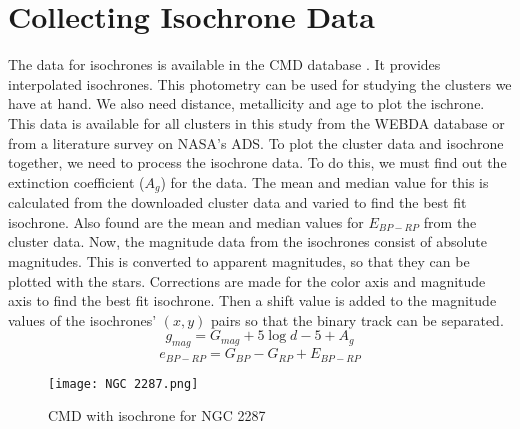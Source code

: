 \section{Collecting Isochrone Data}
The data for isochrones is available in the CMD database \citep{cmdSite}. It provides interpolated isochrones. This photometry can be used for studying the clusters we have at hand. We also need distance, metallicity and age to plot the ischrone. This data is available for all clusters in this study from the WEBDA database \citep{webda} or from a literature survey on NASA's ADS. To plot the cluster data and isochrone together, we need to process the isochrone data. To do this, we must find out the extinction coefficient ($A_g$) for the data. The mean and median value for this is calculated from the downloaded cluster data and varied to find the best fit isochrone. Also found are the mean and median values for $E_{BP-RP}$ from the cluster data. Now, the magnitude data from the isochrones consist of absolute magnitudes. This is converted to apparent magnitudes, so that they can be plotted with the stars. Corrections are made for the color axis and magnitude axis to find the best fit isochrone. Then a shift value is added to the magnitude values of the isochrones' $(x,y)$ pairs so that the binary track can be separated.
$$g_{mag} = G_{mag} + 5 \log d - 5 + A_g$$
$$e_{BP-RP} = G_{BP} - G_{RP} + E_{BP-RP}$$

\begin{figure}[h]
	\centering
	\texttt{[image: NGC 2287.png]}
	\caption{CMD with isochrone for NGC 2287}
	\label{fig:im3}
\end{figure}


